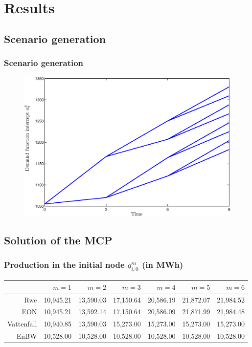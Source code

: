 \section{Results}

\subsection{Scenario generation}

\begin{frame}
  \frametitle{Scenario generation}
\begin{figure}[h]
  \centering
\includegraphics[width=1\textwidth]{intercept}
  \label{fig:intercept}
\end{figure}  
\end{frame}


\subsection{Solution of the MCP}

\begin{frame}
  \frametitle{Production in the initial node $q_{i,0}^{m}$ (in MWh)}
  \begin{center}
\scriptsize
      \begin{tabular}{rrrrrrr}
\hline
           &     $m=1$ &     $m=2$ &     $m=3$ &     $m=4$ &     $m=5$ &     $m=6$ \\
\hline\hline
       Rwe &    10,945.21  &    13,590.03  &    17,150.64  &    20,586.19  &    21,872.07  &    21,984.52  \\

       EON &    10,945.21  &    13,592.14  &    17,150.64  &    20,586.09  &    21,871.99  &    21,984.48  \\

    Vattenfall &    10,940.85  &    13,590.03  &    15,273.00  &    15,273.00  &    15,273.00  &    15,273.00  \\

      EnBW &    10,528.00  &    10,528.00  &    10,528.00  &    10,528.00  &    10,528.00  &    10,528.00  \\
\hline
\end{tabular}
\normalsize
  \end{center}
\end{frame}



